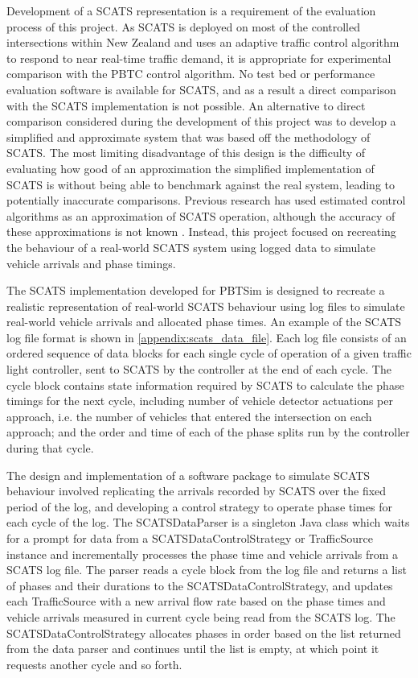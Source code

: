 Development of a SCATS representation is a requirement of the evaluation process of this project. As SCATS is deployed on most of the controlled intersections within New Zealand and uses an adaptive traffic control algorithm to respond to near real-time traffic demand, it is appropriate for experimental comparison with the PBTC control algorithm. No test bed or performance evaluation software is available for SCATS, and as a result a direct comparison with the SCATS implementation is not possible. An alternative to direct comparison considered during the development of this project was to develop a simplified and approximate system that was based off the methodology of SCATS. The most limiting disadvantage of this design is the difficulty of evaluating how good of an approximation the simplified implementation of SCATS is without being able to benchmark against the real system, leading to potentially inaccurate comparisons. Previous research has used estimated control algorithms as an approximation of SCATS operation, although the accuracy of these approximations is not known \cite{akcelik1998evaluation}. Instead, this project focused on recreating the behaviour of a real-world SCATS system using logged data to simulate vehicle arrivals and phase timings.

The SCATS implementation developed for PBTSim is designed to recreate a realistic representation of real-world SCATS behaviour using log files to simulate real-world vehicle arrivals and allocated phase times. An example of the SCATS log file format is shown in \ref{appendix:scats_data_file}. Each log file consists of an ordered sequence of data blocks for each single cycle of operation of a given traffic light controller, sent to SCATS by the controller at the end of each cycle. The cycle block contains state information required by SCATS to calculate the phase timings for the next cycle, including number of vehicle detector actuations per approach, i.e. the number of vehicles that entered the intersection on each approach; and the order and time of each of the phase splits run by the controller during that cycle. 

The design and implementation of a software package to simulate SCATS behaviour involved replicating the arrivals recorded by SCATS over the fixed period of the log, and developing a control strategy to operate phase times for each cycle of the log. The SCATSDataParser is a singleton Java class which waits for a prompt for data from a SCATSDataControlStrategy or TrafficSource instance and incrementally processes the phase time and vehicle arrivals from a SCATS log file. The parser reads a cycle block from the log file and returns a list of phases and their durations to the SCATSDataControlStrategy, and updates each TrafficSource with a new arrival flow rate based on the phase times and vehicle arrivals measured in current cycle being read from the SCATS log. The SCATSDataControlStrategy allocates phases in order based on the list returned from the data parser and continues until the list is empty, at which point it requests another cycle and so forth.

